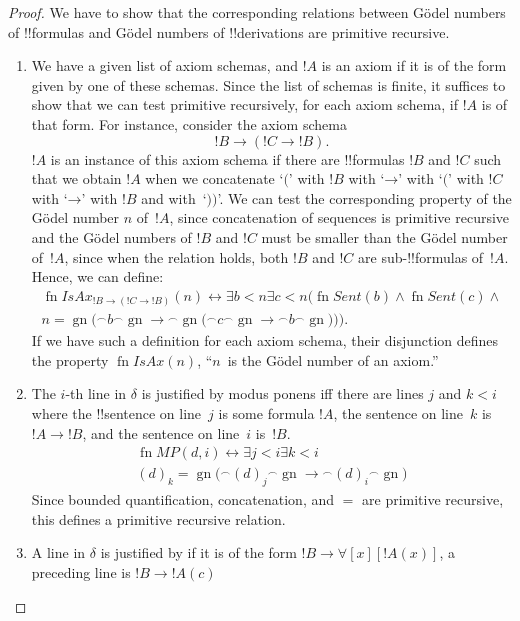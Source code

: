 \documentclass[10pt,a4paper]{article}
\theoremstyle{plain}
\theoremstyle{definition}
\theoremstyle{remark}
\providecommand{\lif}{\mathbin{\rightarrow}}
\providecommand{\lforall}{\mathord{\forall}}
\providecommand{\concat}{\mathbin{{}^\frown}}
\providecommand{\Gn}{\operatorname{gn}}
\providecommand{\bexists}{\exists}
\providecommand{\QR}{\mathrm{QR}}
\providecommand{\defiff}{\mathrel{\leftrightarrow}}
\providecommand{\fn}{\operatorname{fn}}
\providecommand{\defiff}{\mathrel{\leftrightarrow}}
\providecommand{\fn}{\operatorname{fn}}
\begin{document}
\begin{proof}
We have to show that the corresponding relations between G\"odel
numbers of !!{formula}s and  G\"odel numbers of !!{derivation}s 
are primitive recursive.
\begin{enumerate}
\item We have a given list of axiom schemas, and $!A$ is an axiom if
  it is of the form given by one of these schemas.  Since the list of
  schemas is finite, it suffices to show that we can test primitive
  recursively, for each axiom schema, if $!A$ is of that form. For
  instance, consider the axiom schema
  \[
  !B \lif (!C \lif !B).
  \]
  $!A$ is an instance of this axiom schema if there are !!{formula}s
  $!B$ and $!C$ such that we obtain $!A$ when we concatenate `$($'
  with $!B$ with `$\lif$' with `$($' with $!C$ with `$\lif$' with $!B$
  and with~`$))$'. We can test the corresponding property of the
  G\"odel number $n$ of~$!A$, since concatenation of sequences is
  primitive recursive and the G\"odel numbers of $!B$ and $!C$ must
  be smaller than the G\"odel number of~$!A$, since when the relation
  holds, both $!B$ and $!C$ are sub-!!{formula}s of~$!A$. Hence, we
  can define:
  \begin{multline*}
  \fn{IsAx}_{!B \lif (!C \lif !B)}(n) \defiff \bexists{b< n}{
    \bexists{c < n}{(\fn{Sent}(b) \land \fn{Sent}(c) \land {}}}\\ n =
  \Gn{(} \concat b \concat \Gn{\lif} \concat \Gn{(} \concat c \concat
  \Gn{\lif} \concat b \concat \Gn{))}).
  \end{multline*}
  If we have such a definition for each axiom schema, their
  disjunction defines the property $\fn{IsAx}(n)$, ``$n$~is the
  G\"odel number of an axiom.''
\item The $i$-th line in $\delta$ is justified by modus ponens iff there
  are lines $j$ and $k < i$ where the !!{sentence} on line~$j$ is some
  formula $!A$, the sentence on line~$k$ is $!A \lif !B$, and the
  sentence on line~$i$ is~$!B$.
  \begin{multline*}
    \fn{MP}(d, i) \defiff \bexists{j < i}{\bexists{k < i}{}}\\
    (d)_k = \Gn{(} \concat (d)_j
      \concat \Gn{\lif} \concat (d)_i \concat \Gn{)}
  \end{multline*}
  Since bounded quantification, concatenation, and $=$ are primitive
  recursive, this defines a primitive recursive relation. 
\item A line in $\delta$ is justified by \QR{} if it is of the form
  $!B \lif \lforall[x][!A(x)]$, a preceding line is $!B \lif !A(c)$

\end{enumerate}
\end{proof}
\end{document}
